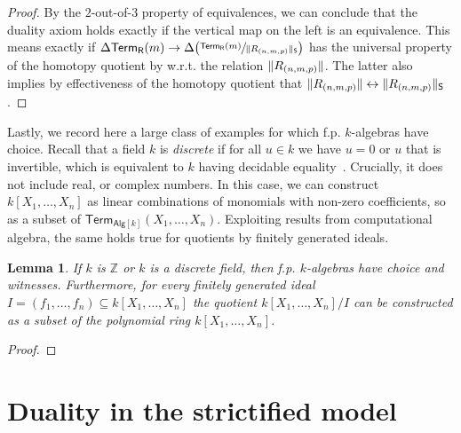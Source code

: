 \documentclass[10pt,a4paper]{article}
\newtheorem{lemma}{Lemma}[section]
\newcommand{\ints}{\mathbb{Z}}
\newcommand{\Alg}{\mathsf{Alg}}
\DeclarePairedDelimiter\paren{(}{)}
\newcommand\R{\mathsf{R}}
\newcommand\Term{\mathsf{Term}}
\begin{document}
\begin{proof}
  By the \(2\)-out-of-\(3\) property of equivalences, we can conclude that the duality axiom holds exactly if the vertical map on the left is an equivalence.
  This means exactly if \(\Delta\Term_{\R}(m) \to \Delta\paren[\big]{\sfrac{\Term_{\R}(m)}{\trunc*{R_{(n,m,p)}}}}\) has the universal property of the homotopy quotient by w.r.t. the relation \(\trunc{R_{(n,m,p)}}\).
  The latter also implies by effectiveness of the homotopy quotient that \(\trunc{R_{(n,m,p)}} \leftrightarrow \trunc*{R_{(n,m,p)}}\).

\end{proof}

Lastly, we record here a large class of examples for which f.p. \(k\)-algebras have choice.
Recall that a field $k$ is \emph{discrete} if for all $u \in k$ we have $u = 0$ or $u$ that is invertible, which is equivalent to $k$ having decidable equality~\cite{mines}.
Crucially, it does not include real, or complex numbers.
In this case, we can construct $k[X_1, \ldots, X_n]$ as linear combinations of monomials with non-zero coefficients, so as a subset of $\Term_{\Alg[k]}(X_1, \ldots, X_n)$.
Exploiting results from computational algebra, the same holds true for quotients by finitely generated ideals.

\begin{lemma}
  If $k$ is $\ints$ or $k$ is a discrete field, then f.p. \(k\)-algebras have choice and witnesses.
  Furthermore, for every finitely generated ideal $I = (f_1, \ldots, f_n) \subseteq k[X_1, \ldots, X_n]$ the quotient $k[X_1,\ldots,X_n]/I$ can be constructed as a subset of the polynomial ring $k[X_1, \ldots, X_n]$.
\end{lemma}
\begin{proof}
\end{proof}




\section{Duality in the strictified model}\label{sec:duality-in-model-of-modal-types}

\end{document}
